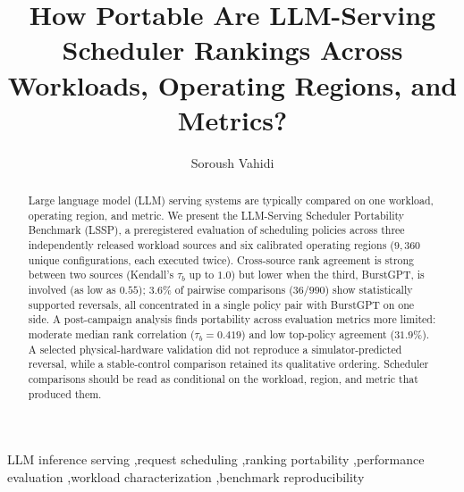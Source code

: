 \documentclass[preprint,12pt]{elsarticle}
\begin{document}
\begin{frontmatter}


\title{How Portable Are LLM-Serving Scheduler Rankings Across Workloads, Operating Regions, and Metrics?}

\author[inst1]{Soroush Vahidi}


\begin{abstract}
Large language model (LLM) serving systems are typically compared on one
workload, operating region, and metric. We present the LLM-Serving Scheduler
Portability Benchmark (LSSP), a preregistered evaluation of scheduling
policies across three independently released workload sources and six
calibrated operating regions ($9{,}360$ unique configurations, each
executed twice). Cross-source rank agreement is strong
between two sources (Kendall's $\tau_b$ up to $1.0$) but lower when the
third, BurstGPT, is involved (as low as $0.55$); $3.6\%$ of pairwise
comparisons ($36/990$) show statistically supported reversals, all
concentrated in a single policy pair with BurstGPT on one side. A
post-campaign analysis finds portability across evaluation metrics more
limited: moderate median rank correlation ($\tau_b=0.419$) and
low top-policy agreement ($31.9\%$). A selected physical-hardware
validation did not reproduce a simulator-predicted reversal, while a
stable-control comparison retained its qualitative ordering.
Scheduler comparisons should be read as conditional on the workload,
region, and metric that produced them.
\end{abstract}

\begin{keyword}
LLM inference serving \sep request scheduling \sep ranking portability \sep performance evaluation \sep workload characterization \sep benchmark reproducibility
\end{keyword}

\end{frontmatter}

















\end{document}
